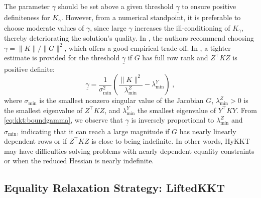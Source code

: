 \begin{remark}
    The parameter $\gamma$ should be set above a given threshold $\underline{\gamma}$ to ensure positive definiteness for $K_\gamma$.
    However, from a numerical standpoint, it is preferable to choose moderate
    values of $\gamma$, since large $\gamma$ increases the ill-conditioning of $K_\gamma$, thereby deteriorating the solution's quality.
    In \cite{golub2003solving}, the authors recommend choosing $\gamma = \| K \| / \|G\|^2$, which offers a good empirical trade-off.
    In \cite[Lemma 2.10]{gould2010spectral}, a tighter estimate is provided
    for the threshold $\underline{\gamma}$ if $G$ has full row rank and $Z^\top K Z$ is positive definite:
    \begin{equation}
      \label{eq:kkt:boundgamma}
      \underline{\gamma} = \dfrac{1}{\sigma_{\min}^2} \left(
        \dfrac{\|K\|^2}{\lambda_{\min}^Z} - \lambda_{\min}^Y
      \right) \; ,
    \end{equation}
    where $\sigma_{\min}$ is the smallest nonzero singular value of the
    Jacobian $G$, $\lambda_{\min}^Z > 0$ is the smallest eigenvalue of
    $Z^\top K Z$, and $\lambda_{\min}^Y$ the smallest eigenvalue of $Y^\top K Y$.
    From \eqref{eq:kkt:boundgamma}, we observe that $\underline{\gamma}$ is
    inversely proportional to $\lambda_{\min}^Z$ and $\sigma_{\min}$,
    indicating that it can reach a large magnitude if $G$ has nearly linearly dependent
    rows or if $Z^\top K Z$ is close to being indefinite.
    In other words, HyKKT may have difficulties solving problems with
    nearly dependent equality constraints or when the reduced Hessian is nearly indefinite.
\end{remark}





\subsection{Equality Relaxation Strategy: LiftedKKT}
\label{sec:kkt:sckkt}

